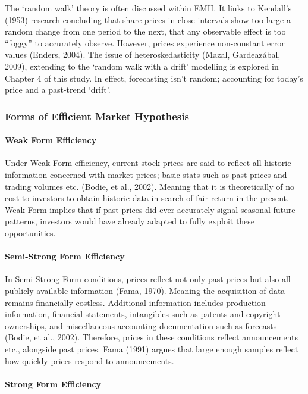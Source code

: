 \documentclass[11pt, english]{article}
\begin{document}
		The `random walk' theory is often discussed within EMH. It links to Kendall’s (1953) research concluding that share prices in close intervals show too-large-a random change from one period to the next, that any observable effect is too ``foggy'' to accurately observe. However, prices experience non-constant error values (Enders, 2004). The issue of heteroskedasticity (Mazal, Gardeazábal, 2009), extending to the `random walk with a drift' modelling is explored in Chapter 4 of this study. In effect, forecasting isn’t random; accounting for today’s price and a past-trend `drift'.
	
		\subsubsection{Forms of Efficient Market Hypothesis}

			\paragraph{Weak Form Efficiency}

			Under Weak Form efficiency, current stock prices are said to reflect all historic information concerned with market prices; basic stats such as past prices and trading volumes etc. (Bodie, et al., 2002). Meaning that it is theoretically of no cost to investors to obtain historic data in search of fair return in the present. Weak Form implies that if past prices did ever accurately signal seasonal future patterns, investors would have already adapted to fully exploit these opportunities.

			\paragraph{Semi-Strong Form Efficiency}

			In Semi-Strong Form conditions, prices reflect not only past prices but also all publicly available information (Fama, 1970). Meaning the acquisition of data remains financially costless. Additional information includes production information, financial statements, intangibles such as patents and copyright ownerships, and miscellaneous accounting documentation such as forecasts (Bodie, et al., 2002). Therefore, prices in these conditions reflect announcements etc., alongside past prices. Fama (1991) argues that large enough samples reflect how quickly prices respond to announcements.

			\paragraph{Strong Form Efficiency}
\end{document}
